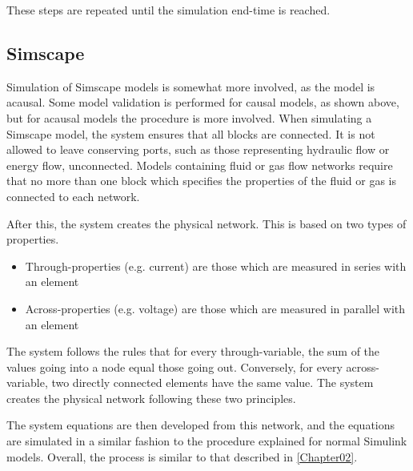 \documentclass[\rootfolder/main.tex]{subfiles}
\begin{document}
These steps are repeated until the simulation end-time is reached.

\subsection{Simscape}

Simulation of Simscape models is somewhat more involved, as the model is acausal.
Some model validation is performed for causal models, as shown above, but for acausal models the procedure is more involved.
When simulating a Simscape model, the system ensures that all blocks are connected.
It is not allowed to leave conserving ports, such as those representing hydraulic flow or energy flow, unconnected.
Models containing fluid or gas flow networks require that no more than one block which specifies the properties of the fluid or gas is connected to each network.

After this, the system creates the physical network.
This is based on two types of properties.

\begin{itemize}
    \item Through-properties (e.g. current) are those which are measured in series with an element
    \item Across-properties (e.g. voltage) are those which are measured in parallel with an element
\end{itemize}

The system follows the rules that for every through-variable, the sum of the values going into a node equal those going out.
Conversely, for every across-variable, two directly connected elements have the same value.
The system creates the physical network following these two principles.

The system equations are then developed from this network, and the equations are simulated in a similar fashion to the procedure explained for normal Simulink models.
Overall, the process is similar to that described in \cref{Chapter02}.
\end{document}
